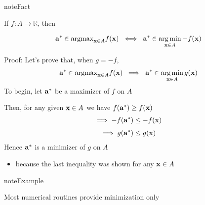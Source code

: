 \documentclass[letterpaper,10pt,english]{jupyterBook}
\begin{document}
\begin{sphinxadmonition}{note}{Fact}

\sphinxAtStartPar
If \(f \colon A \to \mathbb{R}\), then
\end{sphinxadmonition}
\begin{equation*}
\begin{split}
%
{\bf a}^* \in \mathrm{argmax}_{{\bf x} \in A}f({\bf x})
\; \iff \;
{\bf a}^* \in \argmin_{{\bf x} \in A} -f({\bf x})
%
\end{split}
\end{equation*}
\begin{figure}[htbp]
\centering

\noindent{}
\end{figure}

\sphinxAtStartPar
Proof: Let’s prove that, when \(g = -f\),
\begin{equation*}
\begin{split}
%
{\bf a}^* \in \mathrm{argmax}_{{\bf x} \in A}f({\bf x})
\; \implies \;
{\bf a}^* \in \argmin_{{\bf x} \in A}g({\bf x})
%
\end{split}
\end{equation*}
\sphinxAtStartPar
To begin, let \({\bf a}^*\) be a maximizer of \(f\) on \(A\)

\sphinxAtStartPar
Then, for any given \({\bf x} \in A\) we have \(f({\bf a}^*) \geq f({\bf x})\)
\begin{equation*}
\begin{split}
%
\implies
-f({\bf a}^*) \leq -f({\bf x})
%
\end{split}
\end{equation*}\begin{equation*}
\begin{split}
%
\implies
g({\bf a}^*) \leq g({\bf x})
%
\end{split}
\end{equation*}
\sphinxAtStartPar
Hence \({\bf a}^*\) is a minimizer of \(g\) on \(A\)
\begin{itemize}
\item {} 
\sphinxAtStartPar
because the last inequality was shown for any \({\bf x} \in A\)

\end{itemize}

\begin{sphinxadmonition}{note}{Example}

\sphinxAtStartPar
Most numerical routines provide minimization only
\end{sphinxadmonition}
\end{document}
